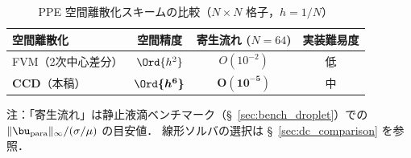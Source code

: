 \begin{table}[ht]
\centering
\caption{PPE 空間離散化スキームの比較（$N \times N$ 格子，$h = 1/N$）}
\label{tab:ccd_vs_fvm}
\renewcommand{\arraystretch}{1.4}
\begin{tabular}{lccc}
\toprule
空間離散化 & 空間精度 & 寄生流れ ($N=64$) & 実装難易度 \\
\midrule
FVM（2次中心差分） & $\Ord{h^2}$ & $O(10^{-2})$ & 低 \\
\textbf{CCD}（本稿） & $\boldsymbol{\Ord{h^6}}$ & $\bm{O(10^{-5})}$ & 中 \\
\bottomrule
\end{tabular}

\smallskip
注：「寄生流れ」は静止液滴ベンチマーク（§~\ref{sec:bench_droplet}）での
$\|\bu_{\mathrm{para}}\|_\infty/(\sigma/\mu)$ の目安値．
線形ソルバの選択は §~\ref{sec:dc_comparison} を参照．
\end{table}

